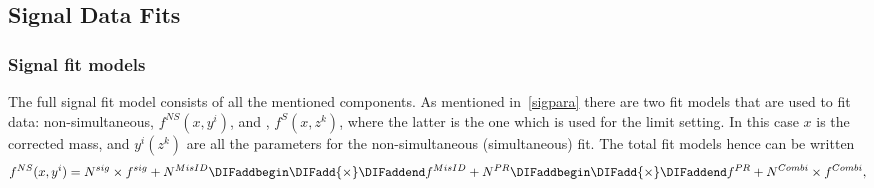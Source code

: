 %
%
\subsection{Signal Data Fits}
\label{fitsens}


\subsubsection{Signal fit models}
The full signal fit model consists of all the mentioned components. As mentioned in~\autoref{sigpara} there are two fit models that are used to fit data: \DIFaddbegin {}\DIFaddend non-simultaneous, $f^{NS}(x,y^{i})$, and \DIFdelbegin {}\DIFdelend \DIFaddbegin {}\DIFaddend , $f^{S}(x,{z^{k}})$, where the latter is the one which is used for the limit setting. In this case $x$ is the corrected mass, and $y^{i}(z^{k})$ are all the parameters for the non-simultaneous (simultaneous) fit. The total fit models hence can be written 
\begin{equation}
f^{NS}(x,y^{i})=N^{sig}\times f^{sig} + N^{MisID} \DIFaddbegin \DIFadd{\times }\DIFaddend f^{MisID} + N^{PR}\DIFaddbegin \DIFadd{\times }\DIFaddend f^{PR} + N^{Combi} \times f^{Combi},
\label{eq:fullhypo}
\end{equation}

